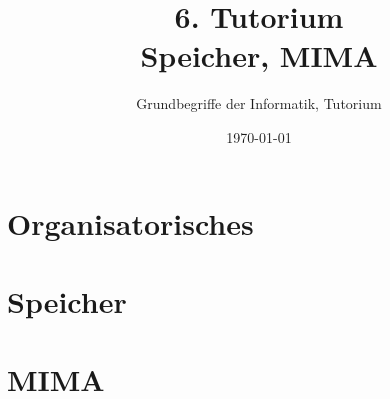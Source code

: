




\title[Speicher, MIMA]{6. Tutorium\\ Speicher, MIMA}
\subtitle{Grundbegriffe der Informatik, Tutorium \hashtag\mytutnumber}
\date{\today}


\titleframe
\roadmap


\section{Organisatorisches}
%

\section{Speicher}


\section{MIMA}




\section{}
\questionframe
\lastframe
{}
